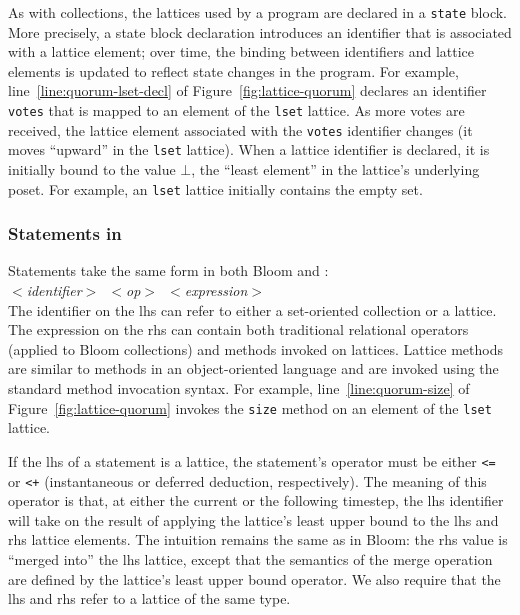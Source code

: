 As with collections, the lattices used by a \lang program are declared in a
\texttt{state} block. More precisely, a state block declaration introduces an
identifier that is associated with a lattice element; over time, the binding
between identifiers and lattice elements is updated to reflect state changes in
the program. For example, line~\ref{line:quorum-lset-decl} of
Figure~\ref{fig:lattice-quorum} declares an identifier \texttt{votes} that is
mapped to an element of the \texttt{lset} lattice. As more votes are received,
the lattice element associated with the \texttt{votes} identifier changes (it
moves ``upward'' in the \texttt{lset} lattice). When a lattice identifier is
declared, it is initially bound to the value $\bot$, the ``least element'' in
the lattice's underlying poset. For example, an \texttt{lset} lattice initially
contains the empty set.

\subsubsection{Statements in \lang}
Statements take the same form in both Bloom and \lang: \\ \noindent
\mbox{\hspace{0.25in}\emph{$<$identifier$>$ $<$op$>$
    $<$expression$>$}}\\ \noindent
The identifier on the lhs can refer to either a set-oriented collection or a
lattice. The expression on the rhs can contain both traditional relational
operators (applied to Bloom collections) and methods invoked on lattices.
Lattice methods are similar to methods in an object-oriented language and are
invoked using the standard method invocation syntax. For example,
line~\ref{line:quorum-size} of Figure~\ref{fig:lattice-quorum} invokes the
\texttt{size} method on an element of the \texttt{lset} lattice.

If the lhs of a statement is a lattice, the statement's operator must be either
\verb|<=| or \verb|<+| (instantaneous or deferred deduction, respectively). The
meaning of this operator is that, at either the current or the following
timestep, the lhs identifier will take on the result of applying the lattice's
least upper bound to the lhs and rhs lattice elements. The intuition remains the
same as in Bloom: the rhs value is ``merged into'' the lhs lattice, except that
the semantics of the merge operation are defined by the lattice's least upper
bound operator. We also require that the lhs and rhs refer to a lattice of the
same type.

